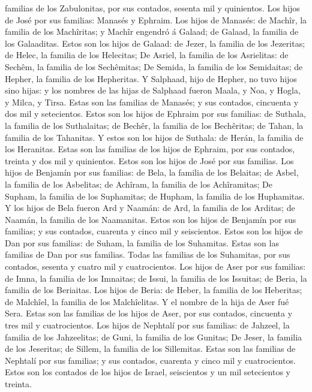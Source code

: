 familias de los Zabulonitas, por sus contados, sesenta mil y quinientos.
 Los hijos de José por sus familias: Manasés y Ephraim.
 Los hijos de Manasés: de Machîr, la familia de los
Machîritas; y Machîr engendró á Galaad; de Galaad, la familia de los
Galaaditas.  Estos son los hijos de Galaad: de Jezer, la
familia de los Jezeritas; de Helec, la familia de los Helecitas;
 De Asriel, la familia de los Asrielitas: de Sechêm, la
familia de los Sechêmitas;  De Semida, la familia de los
Semidaitas; de Hepher, la familia de los Hepheritas.  Y
Salphaad, hijo de Hepher, no tuvo hijos sino hijas: y los nombres de las
hijas de Salphaad fueron Maala, y Noa, y Hogla, y Milca, y Tirsa.
 Estas son las familias de Manasés; y sus contados,
cincuenta y dos mil y setecientos.  Estos son los hijos de
Ephraim por sus familias: de Suthala, la familia de los Suthalaitas; de
Bechêr, la familia de los Bechêritas; de Tahan, la familia de los
Tahanitas.  Y estos son los hijos de Suthala: de Herán, la
familia de los Heranitas.  Estas son las familias de los
hijos de Ephraim, por sus contados, treinta y dos mil y quinientos.
Estos son los hijos de José por sus familias.  Los hijos de
Benjamín por sus familias: de Bela, la familia de los Belaitas; de
Asbel, la familia de los Asbelitas; de Achîram, la familia de los
Achîramitas;  De Supham, la familia de los Suphamitas; de
Hupham, la familia de los Huphamitas.  Y los hijos de Bela
fueron Ard y Naamán: de Ard, la familia de los Arditas; de Naamán, la
familia de los Naamanitas.  Estos son los hijos de Benjamín
por sus familias; y sus contados, cuarenta y cinco mil y seiscientos.
 Estos son los hijos de Dan por sus familias: de Suham, la
familia de los Suhamitas. Estas son las familias de Dan por sus
familias.  Todas las familias de los Suhamitas, por sus
contados, sesenta y cuatro mil y cuatrocientos.  Los hijos
de Aser por sus familias: de Imna, la familia de los Imnaitas; de Issui,
la familia de los Issuitas; de Beria, la familia de los Beriaitas.
 Los hijos de Beria: de Heber, la familia de los Heberitas;
de Malchîel, la familia de los Malchîelitas.  Y el nombre
de la hija de Aser fué Sera.  Estas son las familias de los
hijos de Aser, por sus contados, cincuenta y tres mil y cuatrocientos.
 Los hijos de Nephtalí por sus familias: de Jahzeel, la
familia de los Jahzeelitas; de Guni, la familia de los Gunitas;
 De Jeser, la familia de los Jeseritas; de Sillem, la
familia de los Sillemitas.  Estas son las familias de
Nephtalí por sus familias; y sus contados, cuarenta y cinco mil y
cuatrocientos.  Estos son los contados de los hijos de
Israel, seiscientos y un mil setecientos y treinta.

